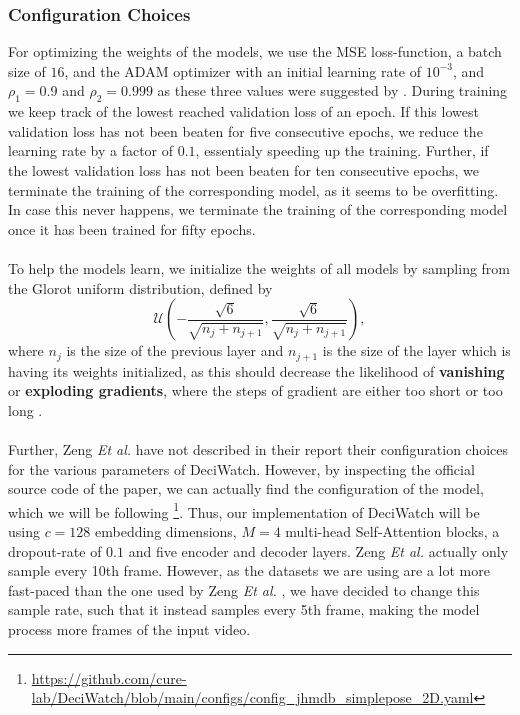 \documentclass[./main.tex]{subfiles}
\begin{document}
\subsubsection{Configuration Choices} 
For optimizing the weights of the models, we use the MSE loss-function, a batch size of $16$, and the ADAM optimizer with an initial learning rate of $10^{-3}$, and $\rho_1 = 0.9$ and $\rho_{2} = 0.999$ as these three values were suggested by \cite{DL_book}. During training we keep track of the lowest reached validation loss of an epoch. If this lowest validation loss has not been beaten for five consecutive epochs, we reduce the learning rate by a factor of $0.1$, essentialy speeding up the training. Further, if the lowest validation loss has not been beaten for ten consecutive epochs, we terminate the training of the corresponding model, as it seems to be overfitting. In case this never happens, we terminate the training of the corresponding model once it has been trained for fifty epochs.
\\
\\
To help the models learn, we initialize the weights of all models by sampling from the Glorot uniform distribution, defined by
\begin{equation}
    \mathcal{U} \left(- \frac{\sqrt{6}}{\sqrt{n_j + n_{j + 1}}}, \frac{\sqrt{6}}{\sqrt{n_j + n_{j + 1}}} \right),
\end{equation}
where $n_j$ is the size of the previous layer and $n_{j + 1}$ is the size of the layer which is having its weights initialized, as this should decrease the likelihood of \textbf{vanishing} or \textbf{exploding gradients}, where the steps of gradient are either too short or too long \cite{glorot2010understanding}.
\\
\\
Further, Zeng \textit{Et al.} \cite{https://doi.org/10.48550/arxiv.2203.08713} have not described in their report their configuration choices for the various parameters of DeciWatch. However, by inspecting the official source code of the paper, we can actually find the configuration of the model, which we will be following \footnote{\url{https://github.com/cure-lab/DeciWatch/blob/main/configs/config_jhmdb_simplepose_2D.yaml}}. Thus, our implementation of DeciWatch will be using $c = 128$ embedding dimensions, $M = 4$ multi-head Self-Attention blocks, a dropout-rate of $0.1$ and five encoder and decoder layers. Zeng \textit{Et al.} \cite{https://doi.org/10.48550/arxiv.2203.08713} actually only sample every 10th frame. However, as the datasets we are using are a lot more fast-paced than the one used by Zeng \textit{Et al.} \cite{https://doi.org/10.48550/arxiv.2203.08713}, we have decided to change this sample rate, such that it instead samples every 5th frame, making the model process more frames of the input video.
\end{document}
